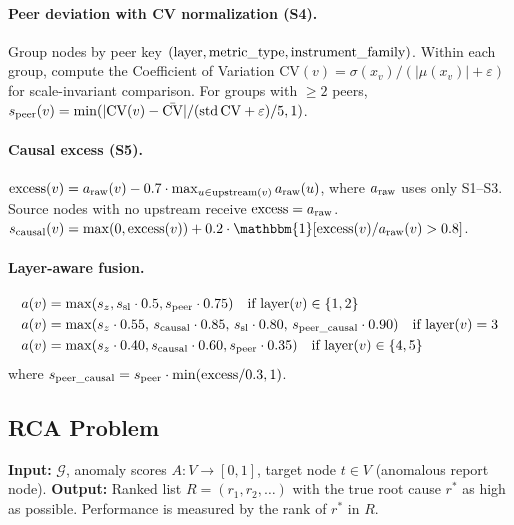 \documentclass{article}
\newcommand{\indicator}{\mathbbm{1}}
\begin{document}
\paragraph{Peer deviation with CV normalization (S4).}
Group nodes by peer key $({\rm layer}, {\rm metric\_type}, {\rm instrument\_family})$.
Within each group, compute the Coefficient of Variation $\mathrm{CV}(v) = \sigma(x_v)/(|\mu(x_v)| + \varepsilon)$ for scale-invariant comparison.
For groups with $\geq 2$ peers, $s_{\text{peer}}(v) = \min(|{\rm CV}(v) - \bar{\rm CV}| / ({\rm std\,CV} + \varepsilon) / 5, 1)$.

\paragraph{Causal excess (S5).}
${\rm excess}(v) = a_{\rm raw}(v) - 0.7 \cdot \max_{u \in {\rm upstream}(v)} a_{\rm raw}(u)$,
where $a_{\rm raw}$ uses only S1--S3.
Source nodes with no upstream receive ${\rm excess} = a_{\rm raw}$.
$s_{\rm causal}(v) = \max(0, {\rm excess}(v)) + 0.2 \cdot \indicator[{\rm excess}(v)/a_{\rm raw}(v) > 0.8]$.

\paragraph{Layer-aware fusion.}
\begin{align*}
  a(v) &= \max(s_z, s_{\rm sl} \cdot 0.5, s_{\rm peer} \cdot 0.75)
          \quad \text{if } {\rm layer}(v) \in \{1,2\} \\
  a(v) &= \max(s_z \cdot 0.55,\, s_{\rm causal} \cdot 0.85,\,
               s_{\rm sl} \cdot 0.80,\, s_{\rm peer\_causal} \cdot 0.90)
          \quad \text{if } {\rm layer}(v) = 3 \\
  a(v) &= \max(s_z \cdot 0.40, s_{\rm causal} \cdot 0.60, s_{\rm peer} \cdot 0.35)
          \quad \text{if } {\rm layer}(v) \in \{4,5\}
\end{align*}
where $s_{\rm peer\_causal} = s_{\rm peer} \cdot \min({\rm excess}/0.3, 1)$.

\subsection{RCA Problem}

\textbf{Input:} $\mathcal{G}$, anomaly scores $A: V \to [0,1]$, target node
$t \in V$ (anomalous report node).
\textbf{Output:} Ranked list $R = (r_1, r_2, \ldots)$ with the true root
cause $r^*$ as high as possible.
Performance is measured by the rank of $r^*$ in $R$.
\end{document}
